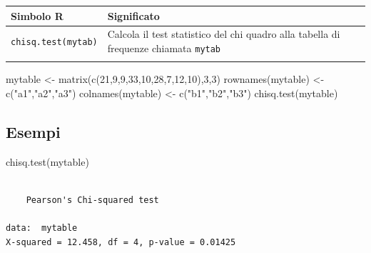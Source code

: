 \documentclass[
  ignorenonframetext,
  compress, aspectratio=149]{beamer}
\newenvironment{Shaded}{}{}
\newcommand{\DecValTok}[1]{\textcolor[rgb]{0.69,0.50,0.00}{#1}}
\newcommand{\FunctionTok}[1]{\textcolor[rgb]{0.39,0.29,0.61}{#1}}
\newcommand{\NormalTok}[1]{\textcolor[rgb]{0.12,0.11,0.11}{#1}}
\newcommand{\OtherTok}[1]{\textcolor[rgb]{0.00,0.43,0.16}{#1}}
\newcommand{\StringTok}[1]{\textcolor[rgb]{0.75,0.01,0.01}{#1}}
\begin{document}
\begin{frame}[fragile]{}
\label{section-3}
\begin{longtable}[]{@{}
  >{\raggedright\arraybackslash}p{}
  >{\raggedright\arraybackslash}p{}@{}}
\toprule\noalign{}
\begin{minipage}[b]{\linewidth}\raggedright
\textbf{Simbolo R}
\end{minipage} & \begin{minipage}[b]{\linewidth}\raggedright
\textbf{Significato}
\end{minipage} \\
\midrule\noalign{}
\endhead
\texttt{chisq.test(mytab)} & Calcola il test statistico del chi quadro
alla tabella di frequenze chiamata \texttt{mytab} \\
\bottomrule\noalign{}
\end{longtable}

\begin{Shaded}
\begin{Highlighting}[]
\NormalTok{mytable }\OtherTok{\textless{}{-}} \FunctionTok{matrix}\NormalTok{(}\FunctionTok{c}\NormalTok{(}\DecValTok{21}\NormalTok{,}\DecValTok{9}\NormalTok{,}\DecValTok{9}\NormalTok{,}\DecValTok{33}\NormalTok{,}\DecValTok{10}\NormalTok{,}\DecValTok{28}\NormalTok{,}\DecValTok{7}\NormalTok{,}\DecValTok{12}\NormalTok{,}\DecValTok{10}\NormalTok{),}\DecValTok{3}\NormalTok{,}\DecValTok{3}\NormalTok{)}
\FunctionTok{rownames}\NormalTok{(mytable) }\OtherTok{\textless{}{-}} \FunctionTok{c}\NormalTok{(}\StringTok{"a1"}\NormalTok{,}\StringTok{"a2"}\NormalTok{,}\StringTok{"a3"}\NormalTok{)}
\FunctionTok{colnames}\NormalTok{(mytable) }\OtherTok{\textless{}{-}} \FunctionTok{c}\NormalTok{(}\StringTok{"b1"}\NormalTok{,}\StringTok{"b2"}\NormalTok{,}\StringTok{"b3"}\NormalTok{)}
\FunctionTok{chisq.test}\NormalTok{(mytable)}
\end{Highlighting}
\end{Shaded}
\end{frame}

\subsection{Esempi}\label{esempi}

\begin{frame}[fragile]{}
\label{section-4}
\begin{Shaded}
\begin{Highlighting}[]
\FunctionTok{chisq.test}\NormalTok{(mytable)}
\end{Highlighting}
\end{Shaded}

\begin{verbatim}

    Pearson's Chi-squared test

data:  mytable
X-squared = 12.458, df = 4, p-value = 0.01425
\end{verbatim}
\end{frame}
\end{document}
